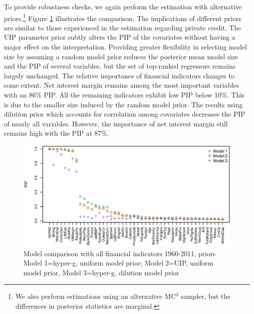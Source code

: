 \begin{refsection}
To provide robustness checks, we again perform the estimation with alternative priors.\footnote{We also perform estimations using an alternative MC$^{3}$ sampler, but the differences in posterior statistics are marginal.} Figure \ref{ch2fig:compall60} illustrates the comparison. The implications of different priors are similar to those experienced in the estimation regarding private credit. The \ac{UIP} parameter prior subtly alters the \ac{PIP} of the covariates without having a major effect on the interpretation. Providing greater flexibility in selecting model size by assuming a random model prior reduces the posterior mean model size and the \ac{PIP} of several variables, but the set of top-ranked regressors remains largely unchanged. The relative importance of financial indicators changes to some extent. Net interest margin remains among the most important variables with an 86\% \ac{PIP}. All the remaining indicators exhibit low \ac{PIP} below 10\%. This is due to the smaller size induced by the random model prior. The results using dilution prior which accounts for correlation among covariates decreases the \ac{PIP} of nearly all variables. However, the importance of net interest margin still remains high with the \ac{PIP} at 87\%.
\begin{figure}[!ht]
	\begin{center}
		\includegraphics[width=\linewidth]{Figures/ch2/plotCompall6011}
		\caption{Model comparison with all financial indicators 1960-2011, priors Model 1=hyper-g, uniform model prior; Model 2=\ac{UIP}, uniform model prior, Model 3=hyper-g, dilution model prior}
		\label{ch2fig:compall60}
	\end{center}
\end{figure}


\end{refsection}
